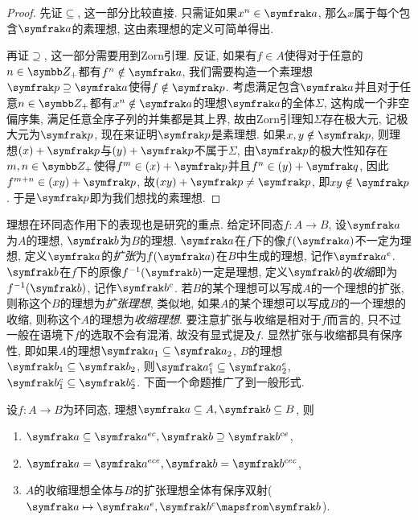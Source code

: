 \begin{proof}
  先证$\subseteq$, 这一部分比较直接. 只需证如果$x^n\in\ideal{a}$, 那么$x$属于每个包含$\ideal{a}$的素理想, 这由素理想的定义可简单得出.

  再证$\supseteq$, 这一部分需要用到Zorn引理. 反证, 如果有$f\in A$使得对于任意的$n\in\ZZ_+$都有$f^n\notin\ideal{a}$, 我们需要构造一个素理想$\ideal{p}\supseteq\ideal{a}$使得$f\notin\ideal{p}$. 考虑满足包含$\ideal{a}$并且对于任意$n\in\ZZ_+$都有$x^n\notin\ideal{a}$的理想$\ideal{a}$的全体$\Sigma$, 这构成一个非空偏序集, 满足任意全序子列的并集都是其上界, 故由Zorn引理知$\Sigma$存在极大元, 记极大元为$\ideal{p}$, 现在来证明$\ideal{p}$是素理想. 如果$x, y\notin\ideal{p}$, 则理想$(x)+\ideal{p}$与$(y)+\ideal{p}$不属于$\Sigma$, 由$\ideal{p}$的极大性知存在$m, n\in\ZZ_+$使得$f^m\in (x)+\ideal{p}$并且$f^n\in (y)+\ideal{q}$, 因此$f^{m+n}\in (xy)+\ideal{p}$, 故$(xy)+\ideal{p}\neq\ideal{p}$, 即$xy\notin\ideal{p}$. 于是$\ideal{p}$即为我们想找的素理想.
\end{proof}

理想在环同态作用下的表现也是研究的重点. 给定环同态$f\colon A\to B$, 设$\ideal{a}$为$A$的理想, $\ideal{b}$为$B$的理想. $\ideal{a}$在$f$下的像$f(\ideal{a})$不一定为理想, 定义$\ideal{a}$的\emph{扩张}为$f(\ideal{a})$在$B$中生成的理想, 记作$\ideal{a}^e$. $\ideal{b}$在$f$下的原像$f^{-1}(\ideal{b})$一定是理想, 定义$\ideal{b}$的\emph{收缩}即为$f^{-1}(\ideal{b})$, 记作$\ideal{b}^c$. 若$B$的某个理想可以写成$A$的一个理想的扩张, 则称这个$B$的理想为\emph{扩张理想}, 类似地, 如果$A$的某个理想可以写成$B$的一个理想的收缩, 则称这个$A$的理想为\emph{收缩理想}. 要注意扩张与收缩是相对于$f$而言的, 只不过一般在语境下$f$的选取不会有混淆, 故没有显式提及$f$. 显然扩张与收缩都具有保序性, 即如果$A$的理想$\ideal{a}_1\subseteq\ideal{a}_2$, $B$的理想$\ideal{b}_1\subseteq\ideal{b}_2$, 则$\ideal{a}_1^e\subseteq\ideal{a}_2^e$, $\ideal{b}_1^c\subseteq\ideal{b}_2^c$. 下面一个命题推广了到一般形式.

\begin{proposition}\label{prop:extencontrcorr}
  设$f\colon A\to B$为环同态, 理想$\ideal{a}\subseteq A, \ideal{b}\subseteq B$, 则
  \begin{enumerate}
    \item $\ideal{a}\subseteq\ideal{a}^{ec}, \ideal{b}\supseteq\ideal{b}^{ce}$,
    \item $\ideal{a}=\ideal{a}^{ece}, \ideal{b}=\ideal{b}^{cec}$,
    \item\label{enum:prop-ec-corr} $A$的收缩理想全体与$B$的扩张理想全体有保序双射($\ideal{a}\mapsto\ideal{a}^e, \ideal{b}^c\mapsfrom\ideal{b}$).
  \end{enumerate}
\end{proposition}


